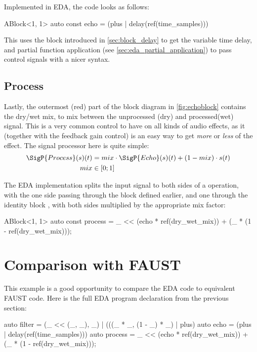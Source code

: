 Implemented in EDA, the code looks as follows: %
\begin{cppcodenl}
  ABlock<1, 1> auto const echo = (plus | delay(ref(time_samples))) %
\end{cppcodenl}

This uses the  block introduced in \autoref{sec:block_delay} to get the variable time
delay, and partial function application (see \autoref{sec:eda_partial_application}) to pass control signals with a nicer
syntax.

\subsection{Process}

Lastly, the outermost (red) part of the block diagram in \autoref{fig:echoblock} contains the dry/wet mix, to
mix between the unprocessed (dry) and processed(wet) signal. This is a very common control to have on all
kinds of audio effects, as it (together with the feedback gain control) is an easy way to get
\emph{more} or \emph{less} of the effect. The signal processor here is quite simple:
\begin{align*}
  \SigP{Process}(s)(t) & = mix \cdot \SigP{Echo}(s)(t) + (1 - mix) \cdot s(t) \\
  mix                  & \in [0; 1]
\end{align*}

The EDA implementation splits the input signal to both sides of a \cpp{+} operation, with the
one side passing through the  block defined earlier, and one through the identity block \cpp{_}, with both sides multiplied by the appropriate mix
factor:

\begin{cppcodenl}
  ABlock<1, 1> auto const process = _ << (echo * ref(dry_wet_mix)) + (_ * (1 - ref(dry_wet_mix)));
\end{cppcodenl}

\section{Comparison with FAUST}

This example is a good opportunity to compare the EDA code to equivalent FAUST code. Here is the full EDA
program declaration from the previous section:

\begin{cppcodenl}
  auto filter = (_ << (_, _), _) | (((_ * _, (1 - _) * _) | plus) %
  auto echo = (plus | delay(ref(time_samples))) %
  auto process = _ << (echo * ref(dry_wet_mix)) + (_ * (1 - ref(dry_wet_mix)));
\end{cppcodenl}

